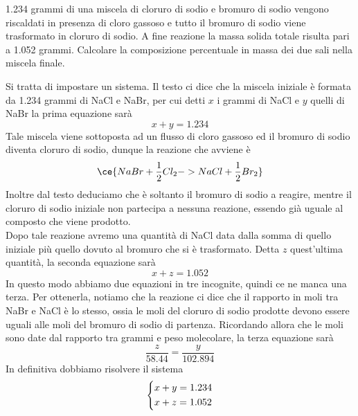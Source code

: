\begin{esercizio}
    1.234 grammi di una miscela di cloruro di sodio e bromuro di sodio vengono riscaldati in presenza di cloro gassoso e tutto il bromuro di sodio viene trasformato in cloruro di sodio. A fine reazione la massa solida totale risulta pari a 1.052 grammi. Calcolare la composizione percentuale in massa dei due sali nella miscela finale.
\end{esercizio}
\begin{soluzione}
    Si tratta di impostare un sistema. Il testo ci dice che la miscela iniziale è formata da 1.234 grammi di NaCl e NaBr, per cui detti $x$ i grammi di NaCl e $y$ quelli di NaBr la prima equazione sarà
    \begin{equation*}
        x + y=1.234
    \end{equation*}
    Tale miscela viene sottoposta ad un flusso di cloro gassoso ed il bromuro di sodio diventa cloruro di sodio, dunque la reazione che avviene è
    \begin{equation*}
        \ce{NaBr + \frac{1}{2}Cl_2 -> NaCl + \frac{1}{2}Br_2}
    \end{equation*}
    Inoltre dal testo deduciamo che è soltanto il bromuro di sodio a reagire, mentre il cloruro di sodio iniziale non partecipa a nessuna reazione, essendo già uguale al composto che viene prodotto.\\
    Dopo tale reazione avremo una quantità di NaCl data dalla somma di quello iniziale più quello dovuto al bromuro che si è trasformato. Detta $z$ quest'ultima quantità, la seconda equazione sarà
    \begin{equation*}
        x + z=1.052
    \end{equation*}
    In questo modo abbiamo due equazioni in tre incognite, quindi ce ne manca una terza. Per ottenerla, notiamo che la reazione ci dice che il rapporto in moli tra NaBr e NaCl è lo stesso, ossia le moli del cloruro di sodio prodotte devono essere uguali alle moli del bromuro di sodio di partenza. Ricordando allora che le moli sono date dal rapporto tra grammi e peso molecolare, la terza equazione sarà
    \begin{equation*}
        \frac{z}{58.44}=\frac{y}{102.894}
    \end{equation*}
    In definitiva dobbiamo risolvere il sistema
    \begin{equation*}
        \begin{dcases}
            x + y=1.234\\
            x + z=1.052\\

\end{dcases}
\end{equation*}
\end{soluzione}
